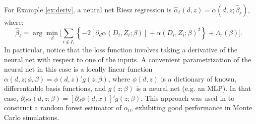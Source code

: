 \documentclass[aos]{imsart}
\numberwithin{equation}{section}
\theoremstyle{plain}
\theoremstyle{remark}
\newtheorem{example}{Example}
\begin{document}
For Example \ref{ex:deriv}, a neural net Riesz regression is  $\hat\alpha_\ell(d, z) = \alpha(d, z; \hat\beta_\ell)$, where:
\[\hat\beta_\ell = \arg\min_{\beta} 
\bigg[
\sum_{i \notin I_\ell}
\left\lbrace
- 2[\partial_d \alpha(D_i, Z_i; \beta)]  +
\alpha(D_i, Z_i; \beta)^2
\right\rbrace
+ \Lambda_r(\beta)
\bigg].
\]
In particular, notice that the loss function involves taking a derivative of the neural net with respect to one of the inputs. A convenient parametrization of the neural net in this case is a locally linear function $\alpha(d, z; \phi, \beta) = \phi(d, z)'g(z; \beta)$, where $\phi(d, z)$ is a dictionary of known, differentiable basis functions, and $g(z; \beta)$ is a neural net (e.g. an MLP). In that case, $\partial_d \alpha(d, z; \beta) = [\partial_d \phi(d, x)]'g(z; \beta)$. This approach was used in \cite{chernozhukov2022riesznet} to construct a random forest estimator of $\alpha_0$, exhibiting good performance in Monte Carlo simulations.



\end{document}
